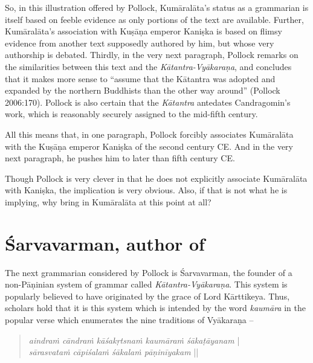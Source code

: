 So, in this illustration offered by Pollock, Kumāralāta's status as a grammarian is itself based on feeble evidence as only portions of the text are available. Further, Kumāralāta's association with Kuṣāṇa emperor Kaniṣka is based on flimsy evidence from another text supposedly authored by him, but whose very authorship is debated. Thirdly, in the very next paragraph, Pollock remarks on the similarities between this text and the {\sl Kātantra-Vyākaraṇa}, and concludes that it makes more sense to ``assume that the Kātantra was adopted and expanded by the northern Buddhists than the other way around'' (Pollock 2006:170). Pollock is also certain that the {\sl Kātantra} antedates Candragomin's work, which is reasonably securely assigned to the mid-fifth century. 

All this means that, in one paragraph, Pollock forcibly associates Kumāralāta with the Kuṣāṇa emperor Kaniṣka of the second century CE. And in the very next paragraph, he pushes him to later than fifth century CE. 

Though Pollock is very clever in that he does not explicitly associate Kumāralāta with Kaniṣka, the implication is very obvious. Also, if that is not what he is implying, why bring in Kumāralāta at this point at all?

\section{Śarvavarman, author of}\label{chap3-sec11}

The next grammarian considered by Pollock is Śarvavarman, the founder of a non-Pāṇinian system of grammar called {\sl Kātantra-Vyākaraṇa}. This system is popularly believed to have originated by the grace of Lord Kārttikeya. Thus, scholars hold that it is this system which is intended by the word {\sl kaumāra} in the popular verse which enumerates the nine traditions of Vyākaraṇa --
\begin{quote}
{{\sl aindraṁ cāndraṁ kāśakṛtsnaṁ kaumāraṁ śākaṭāyanam}} |\\ 
{{\sl sārasvataṁ cāpiśalaṁ śākalaṁ pāṇinīyakam}} || 
\end{quote}

